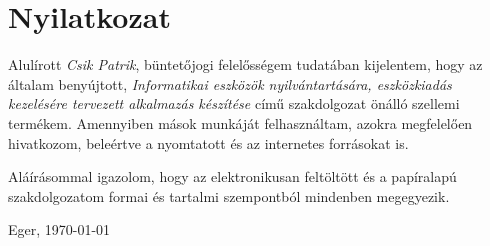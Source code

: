 \documentclass{thesis-ekf}
\begin{document}
\chapter*{Nyilatkozat}

Alulírott \emph{Csik Patrik}, büntetőjogi felelősségem tudatában kijelentem, hogy az általam benyújtott, \emph{Informatikai eszközök nyilvántartására, eszközkiadás kezelésére tervezett alkalmazás készítése} című szakdolgozat önálló szellemi termékem. Amennyiben mások munkáját felhasználtam, azokra megfelelően hivatkozom, beleértve a nyomtatott és az internetes forrásokat is.

Aláírásommal igazolom, hogy az elektronikusan feltöltött és a papíralapú szakdolgozatom formai és tartalmi szempontból mindenben megegyezik.

\bigskip
\begin{flushleft}
Eger, \today
\end{flushleft}

\medskip
\begin{flushright}
\end{flushright}

%
\end{document}
